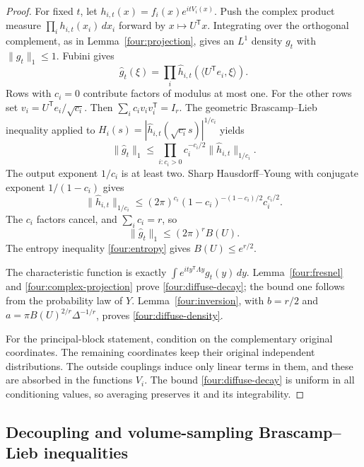 \begin{proof}
For fixed \(t\), let \(h_{i,t}(x)=f_i(x)e^{itV_i(x)}\).  Push the
complex product measure \(\prod_i h_{i,t}(x_i)\,dx_i\) forward by
\(x\mapsto U^{\mathsf T}x\).  Integrating over the orthogonal
complement, as in Lemma~\ref{four:projection}, gives an \(L^1\)
density \(g_t\) with \(\|g_t\|_1\leq1\).  Fubini gives
\[
 \widehat g_t(\xi)
 =\prod_i\widehat h_{i,t}(\langle U^{\mathsf T}e_i,\xi\rangle).
\]
Rows with \(c_i=0\) contribute factors of modulus at most one.
For the other rows set \(v_i=U^{\mathsf T}e_i/\sqrt{c_i}\).
Then \(\sum_i c_iv_iv_i^{\mathsf T}=I_r\).
The geometric Brascamp--Lieb inequality applied to
\(H_i(s)=|\widehat h_{i,t}(\sqrt{c_i}s)|^{1/c_i}\) yields
\[
 \|\widehat g_t\|_1
 \leq\prod_{i:c_i>0}
          c_i^{-c_i/2}\|\widehat h_{i,t}\|_{1/c_i}.
\]
The output exponent \(1/c_i\) is at least two.  Sharp
Hausdorff--Young with conjugate exponent \(1/(1-c_i)\) gives
\[
 \|\widehat h_{i,t}\|_{1/c_i}
 \leq(2\pi)^{c_i}
       (1-c_i)^{-(1-c_i)/2}c_i^{c_i/2}.
\]
The \(c_i\) factors cancel, and \(\sum_i c_i=r\), so
\begin{equation}\label{four:complex-projection}
 \|\widehat g_t\|_1\leq(2\pi)^rB(U).
\end{equation}
The entropy inequality \eqref{four:entropy} gives \(B(U)\leq e^{r/2}\).

The characteristic function is exactly
\(\int e^{it y^{\mathsf T}\Lambda y}g_t(y)\,dy\).
Lemma~\ref{four:fresnel} and \eqref{four:complex-projection} prove
\eqref{four:diffuse-decay}; the bound one follows from the probability
law of \(Y\).  Lemma~\ref{four:inversion}, with
\(b=r/2\) and \(a=\pi B(U)^{2/r}\Delta^{-1/r}\), proves
\eqref{four:diffuse-density}.

For the principal-block statement, condition on the complementary
original coordinates.  The remaining coordinates keep their original
independent distributions.  The outside couplings induce only linear
terms in them, and these are absorbed in the functions \(V_i\).
The bound \eqref{four:diffuse-decay} is uniform in all conditioning
values, so averaging preserves it and its integrability.
\end{proof}

\subsection{Decoupling and volume-sampling Brascamp--Lieb inequalities}

